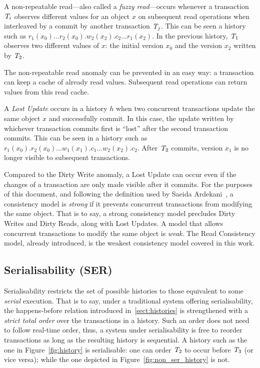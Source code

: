 \begin{definition}
A non-repeatable read---also called a \emph{fuzzy read}---occurs whenever a transaction $\mathit{T}_i$ observes different values for an object $x$ on subsequent read operations when interleaved by a commit by another transaction $\mathit{T}_j$. This can be seen a history such as $r_1(x_0)\ldots r_2(x_0).w_2(x_2).c_2 \ldots r_1(x_2)$. In the previous history, $\mathit{T}_1$ observes two different values of $x$: the initial version $x_0$ and the version $x_2$ written by $\mathit{T}_2$.
\end{definition}

The non-repeatable read anomaly can be prevented in an easy way: a transaction can keep a cache of already read values. Subsequent read operations can return values from this read cache.

\begin{definition}
A \emph{Lost Update} occurs in a history $h$ when two concurrent transactions update the same object $x$ and successfully commit. In this case, the update written by whichever transaction commits first is ``lost'' after the second transaction commits. This can be seen in a history such as $r_1(x_0).r_2(x_0) \ldots w_1(x_1).c_1\ldots w_2(x_2).c_2$. After $\mathit{T}_2$ commits, version $x_1$ is no longer visible to subsequent transactions.
\end{definition}

Compared to the Dirty Write anomaly, a Lost Update can occur even if the changes of a transaction are only made visible after it commits. For the purposes of this document, and following the definition used by Saeida Ardekani~\citep{ardekani_thesis}, a consistency model is \emph{strong} if it prevents concurrent transactions from modifying the same object. That is to say, a strong consistency model precludes Dirty Writes and Dirty Reads, along with Lost Updates. A model that allows concurrent transactions to modify the same object is \emph{weak}. The Read Consistency model, already introduced, is the weakest consistency model covered in this work.

\subsection{Serialisability (SER)}
\label{sect:ser}

Serialisability restricts the set of possible histories to those equivalent to some \emph{serial} execution. That is to say, under a traditional system offering serialisability, the happens-before relation introduced in~\ref{sect:histories} is strengthened with a \emph{strict total order} over the transactions in a history. Such an order does not need to follow real-time order, thus, a system under serialisability is free to reorder transactions as long as the resulting history is sequential. A history such as the one in Figure~\ref{fig:history} is serialisable: one can order $\mathit{T}_2$ to occur before $\mathit{T}_3$ (or vice versa); while the one depicted in Figure~\ref{fig:non_ser_history} is not.

